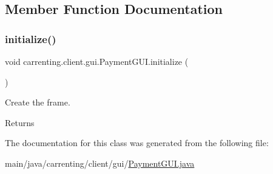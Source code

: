 \subsection{Member Function Documentation}
\mbox{\label{classcarrenting_1_1client_1_1gui_1_1_payment_g_u_i_a19724d907d6135f0e7b18d43504b2cc8}} 
\subsubsection{\texorpdfstring{initialize()}{initialize()}}
{\footnotesize\ttfamily void carrenting.\+client.\+gui.\+Payment\+G\+U\+I.\+initialize (\begin{DoxyParamCaption}{ }\end{DoxyParamCaption})}

Create the frame. \begin{DoxyReturn}{Returns}

\end{DoxyReturn}


The documentation for this class was generated from the following file\+:\begin{DoxyCompactItemize}
\item 
main/java/carrenting/client/gui/\mbox{\hyperlink{_payment_g_u_i_8java}{Payment\+G\+U\+I.\+java}}\end{DoxyCompactItemize}

